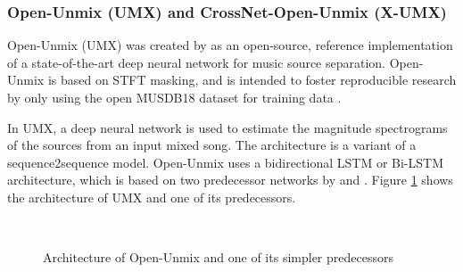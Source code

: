 \documentclass[report.tex]{subfiles}
\begin{document}
\subsubsection{Open-Unmix (UMX) and CrossNet-Open-Unmix (X-UMX)}
\label{sec:umx}

Open-Unmix (UMX) was created by \textcite{umx} as an open-source, reference implementation of a state-of-the-art deep neural network for music source separation. Open-Unmix is based on STFT masking, and is intended to foster reproducible research by only using the open MUSDB18 dataset for training data \parencite{musdb18, musdb18hq}.

In UMX, a deep neural network is used to estimate the magnitude spectrograms of the sources from an input mixed song. The architecture is a variant of a sequence2sequence model. Open-Unmix uses a bidirectional LSTM or Bi-LSTM architecture, which is based on two predecessor networks by \textcite{umxorig1} and \textcite{umxorig2}. Figure \ref{fig:umxes} shows the architecture of UMX and one of its predecessors.

\begin{figure}[ht]
	\centering
	\\
	\caption{Architecture of Open-Unmix and one of its simpler predecessors}
	\label{fig:umxes}
\end{figure}
\end{document}
